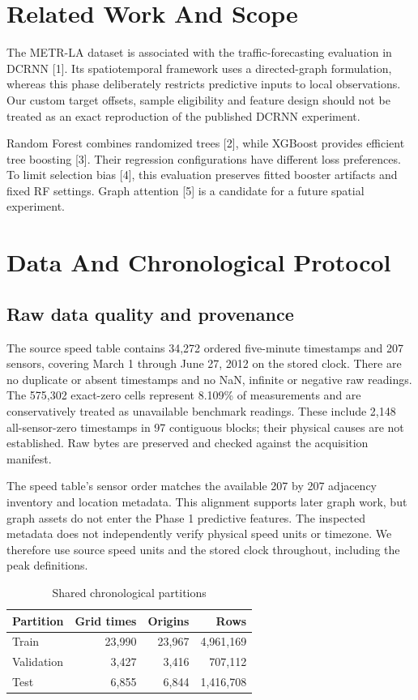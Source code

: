 \documentclass[conference]{IEEEtran}
\begin{document}
\section{Related Work And Scope}
The METR-LA dataset is associated with the traffic-forecasting evaluation in DCRNN [1]. Its spatiotemporal framework uses a directed-graph formulation, whereas this phase deliberately restricts predictive inputs to local observations. Our custom target offsets, sample eligibility and feature design should not be treated as an exact reproduction of the published DCRNN experiment.

Random Forest combines randomized trees [2], while XGBoost provides efficient tree boosting [3]. Their regression configurations have different loss preferences. To limit selection bias [4], this evaluation preserves fitted booster artifacts and fixed RF settings. Graph attention [5] is a candidate for a future spatial experiment.

\section{Data And Chronological Protocol}
\subsection{Raw data quality and provenance}
The source speed table contains 34,272 ordered five-minute timestamps and 207 sensors, covering March 1 through June 27, 2012 on the stored clock. There are no duplicate or absent timestamps and no NaN, infinite or negative raw readings. The 575,302 exact-zero cells represent 8.109\% of measurements and are conservatively treated as unavailable benchmark readings. These include 2,148 all-sensor-zero timestamps in 97 contiguous blocks; their physical causes are not established. Raw bytes are preserved and checked against the acquisition manifest.

The speed table's sensor order matches the available 207 by 207 adjacency inventory and location metadata. This alignment supports later graph work, but graph assets do not enter the Phase 1 predictive features. The inspected metadata does not independently verify physical speed units or timezone. We therefore use source speed units and the stored clock throughout, including the peak definitions.

\begin{table}[t]
\caption{Shared chronological partitions}
\centering\footnotesize
\begin{tabular}{lrrr}
\toprule
Partition & Grid times & Origins & Rows\\
\midrule
Train & 23,990 & 23,967 & 4,961,169\\
Validation & 3,427 & 3,416 & 707,112\\
Test & 6,855 & 6,844 & 1,416,708\\
\bottomrule
\end{tabular}
\end{table}
\end{document}
